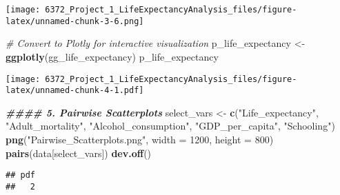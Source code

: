 \documentclass[
]{article}
\newenvironment{Shaded}{\begin{snugshade}}{\end{snugshade}}
\newcommand{\AttributeTok}[1]{\textcolor[rgb]{0.13,0.29,0.53}{#1}}
\newcommand{\CommentTok}[1]{\textcolor[rgb]{0.56,0.35,0.01}{\textit{#1}}}
\newcommand{\DecValTok}[1]{\textcolor[rgb]{0.00,0.00,0.81}{#1}}
\newcommand{\DocumentationTok}[1]{\textcolor[rgb]{0.56,0.35,0.01}{\textbf{\textit{#1}}}}
\newcommand{\FunctionTok}[1]{\textcolor[rgb]{0.13,0.29,0.53}{\textbf{#1}}}
\newcommand{\NormalTok}[1]{#1}
\newcommand{\OtherTok}[1]{\textcolor[rgb]{0.56,0.35,0.01}{#1}}
\newcommand{\StringTok}[1]{\textcolor[rgb]{0.31,0.60,0.02}{#1}}
\begin{document}
\texttt{[image: 6372\_Project\_1\_LifeExpectancyAnalysis\_files/figure-latex/unnamed-chunk-3-6.png]}

\begin{Shaded}
\begin{Highlighting}[]
\CommentTok{\# Convert to Plotly for interactive visualization}
\NormalTok{p\_life\_expectancy }\OtherTok{\textless{}{-}} \FunctionTok{ggplotly}\NormalTok{(gg\_life\_expectancy)}
\NormalTok{p\_life\_expectancy}
\end{Highlighting}
\end{Shaded}

\texttt{[image: 6372\_Project\_1\_LifeExpectancyAnalysis\_files/figure-latex/unnamed-chunk-4-1.pdf]}

\begin{Shaded}
\begin{Highlighting}[]
\DocumentationTok{\#\#\#\# 5. Pairwise Scatterplots}
\NormalTok{select\_vars }\OtherTok{\textless{}{-}} \FunctionTok{c}\NormalTok{(}\StringTok{"Life\_expectancy"}\NormalTok{, }\StringTok{"Adult\_mortality"}\NormalTok{, }\StringTok{"Alcohol\_consumption"}\NormalTok{, }\StringTok{"GDP\_per\_capita"}\NormalTok{, }\StringTok{"Schooling"}\NormalTok{)}
\FunctionTok{png}\NormalTok{(}\StringTok{"Pairwise\_Scatterplots.png"}\NormalTok{, }\AttributeTok{width =} \DecValTok{1200}\NormalTok{, }\AttributeTok{height =} \DecValTok{800}\NormalTok{)}
\FunctionTok{pairs}\NormalTok{(data[select\_vars])}
\FunctionTok{dev.off}\NormalTok{()}
\end{Highlighting}
\end{Shaded}

\begin{verbatim}
## pdf 
##   2
\end{verbatim}
\end{document}
